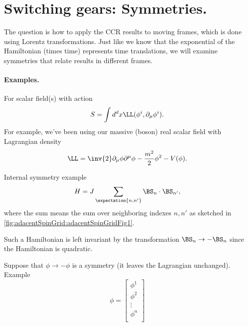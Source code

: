 %
%
\section{Switching gears: Symmetries.}

The question is how to apply the CCR results to moving frames, which is done using Lorentz transformations.  Just like we know that the exponential of the Hamiltonian (times time) represents time translations, we will examine symmetries that relate results in different frames.

\paragraph{Examples.}

For scalar field(s) with action
\begin{equation}\label{eqn:qftLecture6:880}
S = \int d^d x \LL(\phi^i, \partial_\mu \phi^i).
\end{equation}
For example, we've been using our massive (boson) real scalar field with Lagrangian density
\begin{equation}\label{eqn:qftLecture6:900}
\LL = \inv{2} \partial_\mu \phi\partial^\mu \phi - \frac{m^2}{2} \phi^2 - V(\phi).
\end{equation}

Internal symmetry example
\begin{equation}\label{eqn:qftLecture6:920}
H = J \sum_{\expectation{n, n'}} \BS_n \cdot \BS_{n'},
\end{equation}
where the sum means the sum over neighboring indexes \( n, n' \) as sketched in
\cref{fig:adacentSpinGrid:adacentSpinGridFig1}.

Such a Hamiltonian is left invariant by the transformation \( \BS_n \rightarrow -\BS_n \) since the Hamiltonian is quadratic.

Suppose that \( \phi \rightarrow -\phi\) is a symmetry (it leaves the Lagrangian unchanged).  Example
\begin{equation}\label{eqn:qftLecture6:940}
\phi =
\begin{bmatrix}
\phi^1 \\
\phi^2 \\
\vdots \\
\phi^n \\
\end{bmatrix}
\end{equation}

